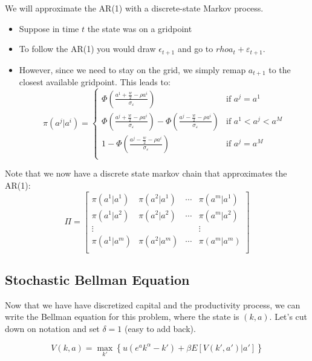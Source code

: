 \documentclass[twoside]{article}
\begin{document}
We will approximate the AR(1) with a discrete-state Markov process. 
\begin{itemize}
\item Suppose in time $t$ the state was on a gridpoint
\item To follow the AR(1) you would draw $\epsilon_{t+1}$ and go to $rho a_t + \varepsilon_{t+1}$. 
\item However, since we need to stay on the grid, we simply remap $a_{t+1}$ to the closest available gridpoint. This leads to:
$$
\pi(a^j | a^i) = \begin{cases}
\Phi \left( \frac{a^1 + \frac{w}{2} - \rho a^i}{\sigma_\varepsilon} \right) & \mbox{if } a^j = a^1 \\
\Phi \left( \frac{a^j + \frac{w}{2} - \rho a^i}{\sigma_\varepsilon} \right) -  \Phi \left( \frac{a^j - \frac{w}{2} - \rho a^i}{\sigma_\varepsilon} \right) & \mbox{if } a^1 < a^j < a^M \\
1 -  \Phi \left( \frac{a^j - \frac{w}{2} - \rho a^i}{\sigma_\varepsilon} \right) & \mbox{if }  a^j = a^M \\
\end{cases}
$$
\end{itemize}

Note that we now have a discrete state markov chain that approximates the AR(1): 
$$
 \Pi = \begin{bmatrix} 
\pi(a^1| a^1) &  \pi(a^2| a^1) & \cdots & \pi(a^m | a^1) \\
\pi(a^1| a^2) &  \pi(a^2| a^2) & \cdots & \pi(a^m | a^2) \\
\vdots & & & \vdots \\
\pi(a^1| a^m) &  \pi(a^2| a^m) & \cdots & \pi(a^m | a^m) \\
\end{bmatrix}
$$ 

\subsection{Stochastic Bellman Equation}

Now that we have have discretized capital and the productivity process, we can write the Bellman equation for this problem, where the state is $(k, a)$. 
Let's cut down on notation and set $\delta = 1$ (easy to add back). 

$$ V(k, a) = \max_{k'} \left\{ u(e^ak^\alpha  - k') + \beta E[V(k', a') | a'] \right\} $$ 
\end{document}
